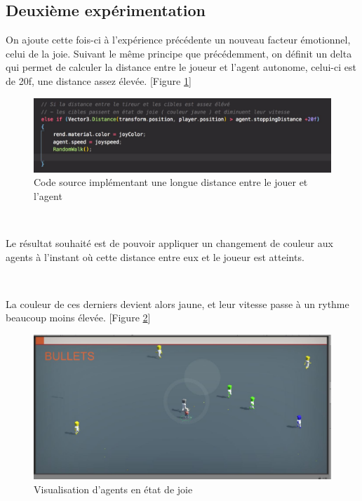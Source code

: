 \subsection{Deuxième expérimentation}

On ajoute cette fois-ci à l'expérience précédente un nouveau facteur émotionnel, celui de la joie.
Suivant le même principe que précédemment, on définit un delta qui permet de calculer la distance entre le joueur et l’agent autonome, celui-ci est de 20f, une distance assez élevée. [Figure \ref{fig:fonct2}]

\begin{figure}[th]
\centering
\includegraphics{Figures/fonct2.JPG}
\decoRule
\caption[Code source implémentant une longue distance]{Code source implémentant une longue distance entre le jouer et l'agent}
\label{fig:fonct2}
\end{figure}



~\par
Le résultat souhaité est de pouvoir appliquer un changement de couleur aux agents à l’instant où cette distance entre eux et le joueur est atteints.

~\par
La couleur de ces derniers devient alors jaune, et leur vitesse passe à un rythme beaucoup moins élevée. [Figure \ref{fig:bichi2}]

\begin{figure}[th]
\centering
\includegraphics{Figures/bichi2.JPG}
\decoRule
\caption[Visualisation d'agents en état de joie]{Visualisation d'agents en état de joie}
\label{fig:bichi2}
\end{figure}


